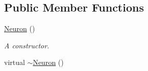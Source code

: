 \subsection*{Public Member Functions}
\begin{DoxyCompactItemize}
\item 
\hypertarget{classNeuron_a823487d01615fadb8ac19a2768dd9d96}{\hyperlink{classNeuron_a823487d01615fadb8ac19a2768dd9d96}{Neuron} ()}\label{classNeuron_a823487d01615fadb8ac19a2768dd9d96}

\begin{DoxyCompactList}\small\item\em A constructor. \end{DoxyCompactList}\item 
\hypertarget{classNeuron_a94a250ce7e167760e593979b899745b1}{virtual \hyperlink{classNeuron_a94a250ce7e167760e593979b899745b1}{$\sim$\-Neuron} ()}\label{classNeuron_a94a250ce7e167760e593979b899745b1}


\end{DoxyCompactItemize}
